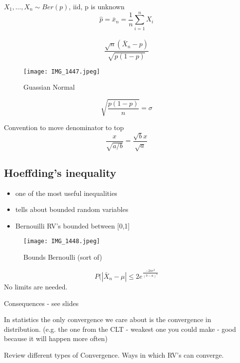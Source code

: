 

$X_1,\ldots,X_n \sim Ber(p)$, iid, p is unknown
\vspace{1cm}
$$\hat{p}=\bar{x}_n = \frac{1}{n} \sum_{i=1}^n X_i$$
\\
$$\frac{\sqrt{n}(\bar{X}_n-p)}{\sqrt{p(1-p)}}$$

\begin{figure}[!ht]
\centering
\texttt{[image: IMG\_1447.jpeg]}
\caption{Guassian Normal}
\end{figure}

$$\sqrt{\frac{p(1-p)}{n}}=\sigma$$

Convention to move denominator to top
$$\frac{x}{\sqrt{a/b}}= \frac{\sqrt{b}x}{\sqrt{a}}$$

\subsection{Hoeffding's inequality}


\begin{itemize}
\item one of the most useful inequalities
\item tells about bounded random variables
\item Bernouilli RV's bounded between [0,1]
\end{itemize}


\begin{figure}[!ht]
\centering
\texttt{[image: IMG\_1448.jpeg]}
\caption{Bounds Bernoulli (sort of)}
\end{figure}

$$P(|\bar{X}_n - \mu| \le 2e^\frac{-2ne^2}{(b-a)^2}$$
No limits are needed.

Consequences - see slides\\



In statistics the only convergence we care about is the convergence in distribution. (e.g. the one from the CLT - weakest one you could make - good because it will happen more often)


Review different types of Convergence.  Ways in which RV's can converge.

